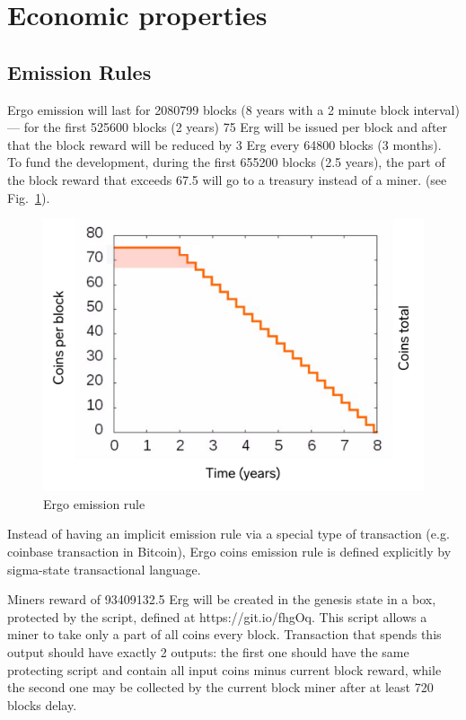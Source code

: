 \section{Economic properties}

\subsection{Emission Rules}

Ergo emission will last for 2080799 blocks (8 years with a 2 minute block interval) --- for the
first 525600 blocks (2 years) 75 Erg will be issued per block and after that the block reward will be
reduced by 3 Erg every 64800 blocks (3 months).
To fund the development, during the first 655200 blocks (2.5 years), the part of the block reward that
exceeds 67.5 will go to a treasury instead of a miner.  (see Fig.~\ref{fig:emission}).

\begin{figure}[H]
    \centering
    \includegraphics[width=\textwidth]{img/emission.jpg}
    \caption{Ergo emission rule
    \label{fig:emission}}
\end{figure}


Instead of having an implicit emission rule via a special type of transaction (e.g. coinbase transaction in Bitcoin),
Ergo coins emission rule is defined explicitly by sigma-state transactional language.

Miners reward of 93409132.5 Erg will be created in the genesis state in a box,
protected by the script, defined at https://git.io/fhgOq.
This script allows a miner to take only a part of all coins every block.
Transaction that spends this output should have exactly 2 outputs: the first one should
have the same protecting script and contain all input coins minus current block reward,
while the second one may be collected by the current block miner after at least
720 blocks delay.

